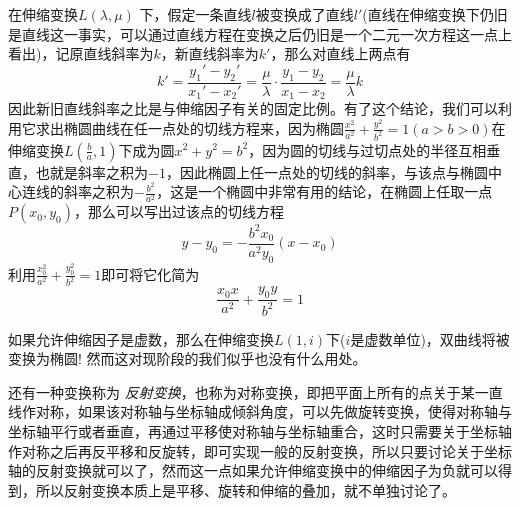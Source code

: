 \begin{example}
  \label{ep:the-tangent-after-scale-translation}
  在伸缩变换$L(\lambda, \mu)$ 下，假定一条直线$l$被变换成了直线$l'$(直线在伸缩变换下仍旧是直线这一事实，可以通过直线方程在变换之后仍旧是一个二元一次方程这一点上看出)，记原直线斜率为$k$，新直线斜率为$k'$，那么对直线上两点有
  \begin{equation}
    \label{eq:tangent-of-scale-translation}
  k'=\frac{y_1'-y_2'}{x_1'-x_2'}=\frac{\mu}{\lambda}\cdot \frac{y_1-y_2}{x_1-x_2}=\frac{\mu}{\lambda}k
  \end{equation}
  因此新旧直线斜率之比是与伸缩因子有关的固定比例。有了这个结论，我们可以利用它求出椭圆曲线在任一点处的切线方程来，因为椭圆$\frac{x^2}{a^2}+\frac{y^2}{b^2}=1(a>b>0)$在伸缩变换$L(\frac{b}{a},1)$下成为圆$x^2+y^2=b^2$，因为圆的切线与过切点处的半径互相垂直，也就是斜率之积为$-1$，因此椭圆上任一点处的切线的斜率，与该点与椭圆中心连线的斜率之积为$-\frac{b^2}{a^2}$，这是一个椭圆中非常有用的结论，在椭圆上任取一点$P(x_0,y_0)$，那么可以写出过该点的切线方程
  \begin{equation*}
  y-y_0=-\frac{b^2x_0}{a^2y_0}(x-x_0)
  \end{equation*}
  利用$\frac{x_0^2}{a^2}+\frac{y_0^2}{b^2}=1$即可将它化简为
  \begin{equation*}
  \frac{x_0x}{a^2}+\frac{y_0y}{b^2}=1
  \end{equation*}
\end{example}

\begin{example}
  如果允许伸缩因子是虚数，那么在伸缩变换$L(1,i)$下($i$是虚数单位)，双曲线将被变换为椭圆! 然而这对现阶段的我们似乎也没有什么用处。
\end{example}

还有一种变换称为 \emph{反射变换}，也称为对称变换，即把平面上所有的点关于某一直线作对称，如果该对称轴与坐标轴成倾斜角度，可以先做旋转变换，使得对称轴与坐标轴平行或者垂直，再通过平移使对称轴与坐标轴重合，这时只需要关于坐标轴作对称之后再反平移和反旋转，即可实现一般的反射变换，所以只要讨论关于坐标轴的反射变换就可以了，然而这一点如果允许伸缩变换中的伸缩因子为负就可以得到，所以反射变换本质上是平移、旋转和伸缩的叠加，就不单独讨论了。



